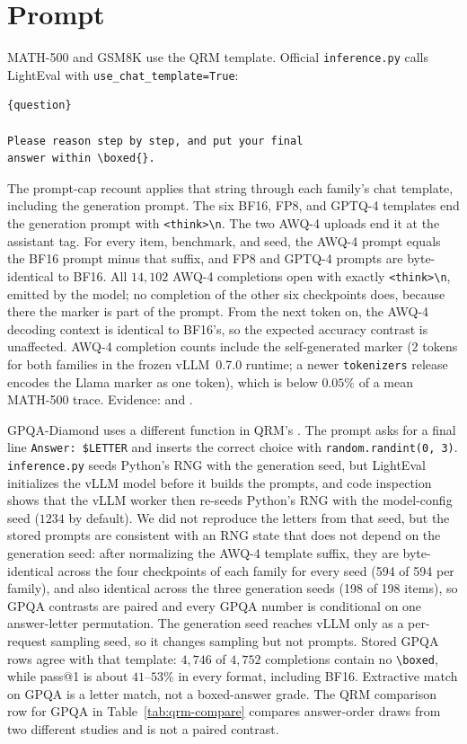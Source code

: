 \documentclass[11pt,a4paper]{article}
\begin{document}
\section{Prompt}
\label{sec:prompt}
MATH-500 and GSM8K use the QRM template. Official \texttt{inference.py} calls LightEval with \texttt{use\_chat\_template=True}:
\begin{verbatim}
{question}

Please reason step by step, and put your final
answer within \boxed{}.
\end{verbatim}
The prompt-cap recount applies that string through each family's chat template, including the generation prompt. The six BF16, FP8, and GPTQ-4 templates end the generation prompt with \texttt{<think>\textbackslash n}. The two AWQ-4 uploads end it at the assistant tag. For every item, benchmark, and seed, the AWQ-4 prompt equals the BF16 prompt minus that suffix, and FP8 and GPTQ-4 prompts are byte-identical to BF16. All $14{,}102$ AWQ-4 completions open with exactly \texttt{<think>\textbackslash n}, emitted by the model; no completion of the other six checkpoints does, because there the marker is part of the prompt. From the next token on, the AWQ-4 decoding context is identical to BF16's, so the expected accuracy contrast is unaffected. AWQ-4 completion counts include the self-generated marker (2 tokens for both families in the frozen vLLM~0.7.0 runtime; a newer \texttt{tokenizers} release encodes the Llama marker as one token), which is below $0.05\%$ of a mean MATH-500 trace. Evidence:  and .

GPQA-Diamond uses a different function in QRM's . The prompt asks for a final line \texttt{Answer: \$LETTER} and inserts the correct choice with \texttt{random.randint(0, 3)}. \texttt{inference.py} seeds Python's RNG with the generation seed, but LightEval initializes the vLLM model before it builds the prompts, and code inspection shows that the vLLM worker then re-seeds Python's RNG with the model-config seed ($1234$ by default). We did not reproduce the letters from that seed, but the stored prompts are consistent with an RNG state that does not depend on the generation seed: after normalizing the AWQ-4 template suffix, they are byte-identical across the four checkpoints of each family for every seed (594 of 594 per family), and also identical across the three generation seeds (198 of 198 items), so GPQA contrasts are paired and every GPQA number is conditional on one answer-letter permutation. The generation seed reaches vLLM only as a per-request sampling seed, so it changes sampling but not prompts. Stored GPQA rows agree with that template: $4{,}746$ of $4{,}752$ completions contain no \texttt{\textbackslash boxed}, while pass@1 is about $41$--$53\%$ in every format, including BF16. Extractive match on GPQA is a letter match, not a boxed-answer grade. The QRM comparison row for GPQA in Table~\ref{tab:qrm-compare} compares answer-order draws from two different studies and is not a paired contrast.
\end{document}
